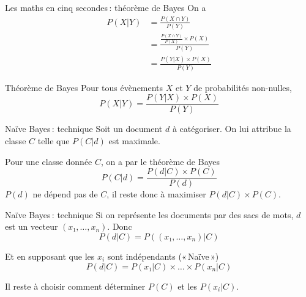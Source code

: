 \documentclass[hyperref={unicode}, xcolor={svgnames}, french]{beamer}
\begin{document}
\begin{frame}{Les maths en cinq secondes : théorème de Bayes}
    On a
    \begin{align}
        P(X|Y)
            &= \frac{P(X∩Y)}{P(Y)}\\
            &= \frac{\frac{P(X∩Y)}{P(X)}×P(X)}{P(Y)}\\
            &= \frac{P(Y|X)×P(X)}{P(Y)}
    \end{align}
    \begin{block}{Théorème de Bayes}
        Pour tous évènements $X$ et $Y$ de probabilités non-nulles,
        \begin{equation}
            P(X|Y)=\frac{P(Y|X)×P(X)}{P(Y)}
        \end{equation}
    \end{block}
\end{frame}

\begin{frame}{Naïve Bayes : technique}
    Soit un document $d$ à catégoriser.
    On lui attribue la classe $C$ telle que $P(C|d)$ est maximale.

    Pour une classe donnée $C$, on a par le théorème de Bayes
    \begin{equation}
        P(C|d) = \frac{P(d|C)×P(C)}{P(d)}
    \end{equation}
    $P(d)$ ne dépend pas de $C$, il reste donc à maximiser $P(d|C)×P(C)$.
\end{frame}

\begin{frame}{Naïve Bayes : technique}
    Si on représente les documents par des sacs de mots, $d$ est un vecteur $(x₁, …, x_n)$.
    Donc
    \begin{equation}
        P(d|C) = P((x₁, …, x_n)|C)
    \end{equation}

    Et en supposant que les $x_i$ sont indépendants (« Naïve »)
    \begin{equation}
        P(d|C) = P(x₁|C)×…×P(x_n|C)
    \end{equation}

    Il reste à choisir comment déterminer $P(C)$ et les $P(x_i|C)$.
\end{frame}

\end{document}
